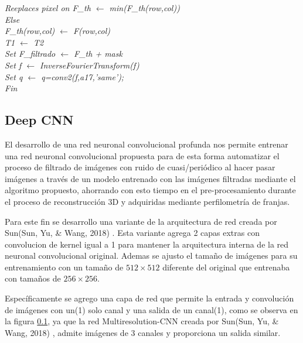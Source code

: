 \documentclass[10pt,letterpaper]{article}
\begin{document}
\hspace*{1.5cm}\textit{Reeplaces pixel on F\_th $\longleftarrow$ min(F\_th(row,col))}\\
\hspace*{1cm}\textit{Else}\\
\hspace*{1.5cm}\textit{F\_th(row,col) $\longleftarrow$ F(row,col)}\\
\hspace*{0.5cm}\textit{T1 $\longleftarrow$ T2}\\
\textit{Set F\_filtrado $\longleftarrow$ F\_th + mask}\\
\textit{Set f $\longleftarrow$ InverseFourierTransform(f)}\\
\textit{Set q $\longleftarrow$ q=conv2(f,a17,'same');}\\
\textit{Fin}\\

\subsection{Deep CNN}
El desarrollo de una red neuronal convolucional profunda nos permite entrenar una red neuronal convolucional propuesta para de esta forma automatizar el proceso de filtrado de imágenes con ruido de cuasi/periódico al hacer pasar imágenes a través de un modelo entrenado con las imágenes filtradas mediante el algoritmo propuesto, ahorrando con esto tiempo en el pre-procesamiento durante el proceso de reconstrucción 3D y adquiridas mediante perfilometría de franjas.

Para este fin se desarrollo una variante de la arquitectura de red creada por Sun(Sun, Yu, \& Wang, 2018) \cite{Sun:Yu}. Esta variante agrega 2 capas extras con convolucion de kernel igual a 1 para mantener la arquitectura interna de la red neuronal convolucional original. Ademas se ajusto el tamaño de imágenes para su entrenamiento con un tamaño de $512 \times 512$ diferente del original que entrenaba con tamaños de $256 \times 256$.

Específicamente se agrego una capa de red que permite la entrada y convolución de imágenes con un(1) solo canal y una salida de un canal(1), como se observa en la figura \ref{}, ya que la red Multiresolution-CNN creada por Sun(Sun, Yu, \& Wang, 2018) \cite{Sun:Yu}, admite imágenes de 3 canales y proporciona un salida similar.
\end{document}
